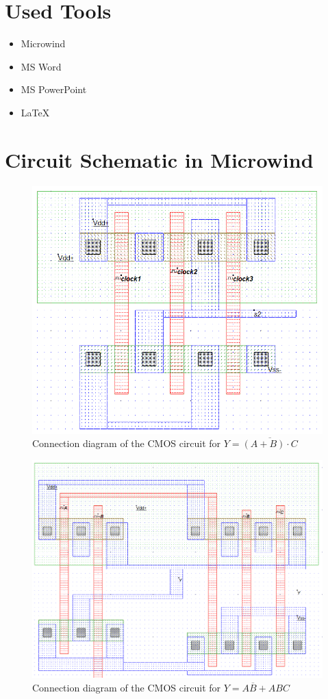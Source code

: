 \documentclass[12pt]{article}
\begin{document}
\section*{Used Tools}
\begin{itemize}
  \item Microwind
  \item MS Word
  \item MS PowerPoint
  \item \LaTeX
\end{itemize}

\section*{Circuit Schematic in Microwind}

\begin{figure}[H]
  \centering
  \includegraphics[width=.9\textwidth]{ckt1.png}
  \caption{Connection diagram of the CMOS circuit for \( Y = \overline{(A + B) \cdot C} \)}
\end{figure}

\begin{figure}[H]
  \centering
  \includegraphics[width=.9\textwidth]{ckt2.png}
  \caption{Connection diagram of the CMOS circuit for \( Y = A\overline{B} + ABC \)}
\end{figure}
\end{document}
